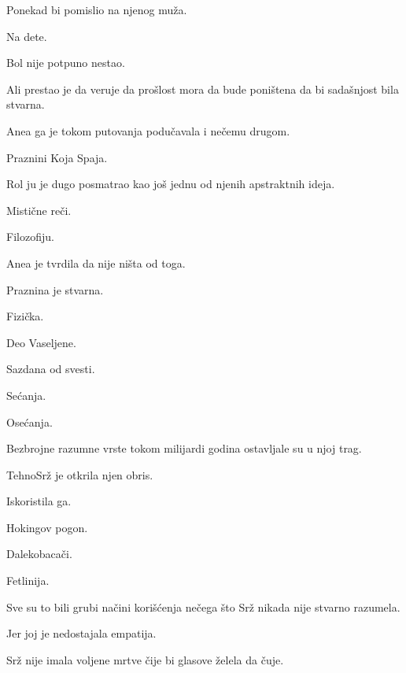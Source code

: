 \bigskip

Ponekad bi pomislio na njenog muža.

Na dete.

\bigskip

Bol nije potpuno nestao.

\bigskip

Ali prestao je da veruje da prošlost mora da bude poništena da bi sadašnjost bila stvarna.

\bigskip

Anea ga je tokom putovanja podučavala i nečemu drugom.

\bigskip

Praznini Koja Spaja.

\bigskip

Rol ju je dugo posmatrao kao još jednu od njenih apstraktnih ideja.

Mistične reči.

Filozofiju.

\bigskip

Anea je tvrdila da nije ništa od toga.

\bigskip

Praznina je stvarna.

Fizička.

Deo Vaseljene.

\bigskip

Sazdana od svesti.

Sećanja.

Osećanja.

\bigskip

Bezbrojne razumne vrste tokom milijardi godina ostavljale su u njoj trag.

\bigskip

TehnoSrž je otkrila njen obris.

Iskoristila ga.

\bigskip

Hokingov pogon.

Dalekobacači.

Fetlinija.

\bigskip

Sve su to bili grubi načini korišćenja nečega što Srž nikada nije stvarno razumela.

\bigskip

Jer joj je nedostajala empatija.

\bigskip

Srž nije imala voljene mrtve čije bi glasove želela da čuje.

\bigskip

